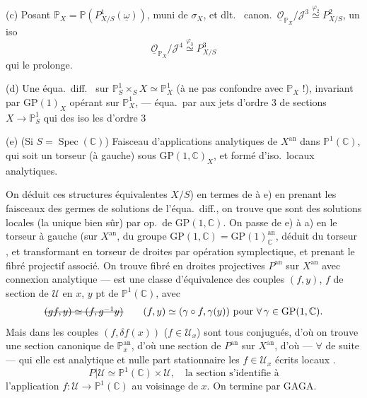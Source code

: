 \documentclass[11pt,a4paper]{article}
\begin{document}
(c) Posant $\mathbb{P}_X=\mathbb{P}(P^1_{X/S}(\underline{\omega}))$, muni de $\sigma_X$, et dlt.\  canon.\ $\underline{\mathcal{O}}_{\mathbb{P}_X}/\mathcal{J}^3\overset{\varphi_2}{\simeq}P^2_{X/S}$, un iso
\[
\underline{\mathcal{O}}_{\mathbb{P}_X}/\mathcal{J}^4\overset{\varphi_3}{\simeq}P^3_{X/S}
\]
qui le prolonge.

(d) Une équa.\ diff.\   sur $\mathbb{P}^1_S\times_S X\simeq\mathbb{P}^1_X$ (à ne pas confondre avec $\mathbb{P}_X$ !), invariant par $\mathrm{GP}(1)_X$ opérant sur $\mathbb{P}^1_X$, — équa.\ par  aux jets d'ordre $3$ de sections  $X\to\mathbb{P}^1_S$ qui \ill{} des iso les \uncertain{\ill{}} d'ordre $3$

(e) (Si $S=\operatorname{Spec}(\mathbb{C})$)  Faisceau d'applications analytiques de $X^{\mathrm{an}}$ dans $\mathbb{P}^1(\mathbb{C})$, qui soit un torseur (à gauche)  sous $\mathrm{GP}(1,\mathbb{C})_X$, et formé d'iso.\ locaux analytiques.

On déduit ces structures équivalentes    $X/S$) en termes de  à e) en prenant les faisceaux des germes de solutions de l'équa.\ diff., on trouve que  sont des solutions locales  (la  unique bien sûr) par op.\ de $\mathrm{GP}(1,\mathbb{C})$. On passe de e) à a) en  le torseur à gauche  (sur $X^{\mathrm{an}}$, du groupe $\mathrm{GP}(1,\mathbb{C})=\mathrm{GP}(1)_{\mathbb{C}}^{\mathrm{an}}$, déduit du torseur \struck{\ill{}} , et transformant en torseur de droites par opération symplectique, et prenant le fibré projectif associé. On trouve fibré en droites projectives $P^{\mathrm{an}}$ sur $X^{\mathrm{an}}$ avec connexion analytique — est une classe d'équivalence des couples $(f,y)$, $f$  de section de $\mathcal{U}$ en $x$, $y$ pt de $\mathbb{P}^1(\mathbb{C})$, avec
\[
\text{\struck{$(gf,y)\simeq(f,g^{-1}y)$}}\qquad (f,y)\simeq(\gamma\circ f,\gamma(y))\ \text{pour}\ \forall\,\gamma\in\mathrm{GP}(1,\mathbb{C}).
\]
Mais dans les couples $(f,\delta f(x))$ ($f\in\mathcal{U}_x$) sont tous conjugués, d'où on trouve une section canonique de $\mathbb{P}^{\mathrm{an}}_x$, d'où une section de $P^{\mathrm{an}}$ sur $X^{\mathrm{an}}$, d'où —  $\forall$ de suite — qui elle est analytique et nulle part stationnaire  les $f\in\mathcal{U}_x$  écrits locaux \struck{\ill{}} \add{\ill{}}.
\[
P|\mathcal{U}\simeq\mathbb{P}^1(\mathbb{C})\times\mathcal{U},\quad\text{la section s'identifie à}
\]
l'application $f:\mathcal{U}\to\mathbb{P}^1(\mathbb{C})$ au voisinage de $x$. On termine par GAGA.
\end{document}
